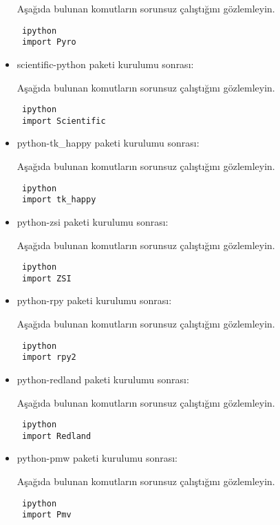 \documentclass[a4paper,10pt]{article}
\begin{document}
\begin{itemize}
Aşağıda bulunan komutların sorunsuz çalıştığını gözlemleyin.

\begin{verbatim}
 ipython
 import Pyro
\end{verbatim}

\item  scientific-python paketi kurulumu sonrası:

Aşağıda bulunan komutların sorunsuz çalıştığını gözlemleyin.

\begin{verbatim}
 ipython
 import Scientific
\end{verbatim}

\item python-tk\_happy paketi kurulumu sonrası:

Aşağıda bulunan komutların sorunsuz çalıştığını gözlemleyin.

\begin{verbatim}
 ipython
 import tk_happy
\end{verbatim}

\item python-zsi paketi kurulumu sonrası:

Aşağıda bulunan komutların sorunsuz çalıştığını gözlemleyin.

\begin{verbatim}
 ipython
 import ZSI
\end{verbatim}


\item python-rpy paketi kurulumu sonrası:

Aşağıda bulunan komutların sorunsuz çalıştığını gözlemleyin.

\begin{verbatim}
 ipython
 import rpy2
\end{verbatim}

\item python-redland paketi kurulumu sonrası:

Aşağıda bulunan komutların sorunsuz çalıştığını gözlemleyin.

\begin{verbatim}
 ipython
 import Redland
\end{verbatim}

\item python-pmw paketi kurulumu sonrası:

Aşağıda bulunan komutların sorunsuz çalıştığını gözlemleyin.

\begin{verbatim}
 ipython
 import Pmv
\end{verbatim}


\end{itemize}
\end{document}
